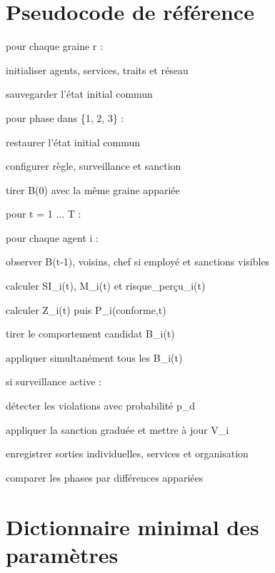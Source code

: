 \documentclass[11pt,a4paper]{article}
\begin{document}
\clearpage
\appendix
\section{Pseudocode de référence}

\begin{tcolorbox}[
  enhanced,breakable,
  colback=Ink,colframe=Ink,
  coltext=white,
  fontupper=\ttfamily\small,
  arc=1mm,left=4mm,right=4mm,top=3mm,bottom=3mm]
pour chaque graine r :\par
\quad initialiser agents, services, traits et réseau\par
\quad sauvegarder l'état initial commun\par
\quad pour phase dans \{1, 2, 3\} :\par
\qquad restaurer l'état initial commun\par
\qquad configurer règle, surveillance et sanction\par
\qquad tirer B(0) avec la même graine appariée\par
\qquad pour t = 1 ... T :\par
\qquad\quad pour chaque agent i :\par
\qquad\qquad observer B(t-1), voisins, chef si employé et sanctions visibles\par
\qquad\qquad calculer SI\_i(t), M\_i(t) et risque\_perçu\_i(t)\par
\qquad\qquad calculer Z\_i(t) puis P\_i(conforme,t)\par
\qquad\qquad tirer le comportement candidat B\_i(t)\par
\qquad\quad appliquer simultanément tous les B\_i(t)\par
\qquad\quad si surveillance active :\par
\qquad\qquad détecter les violations avec probabilité p\_d\par
\qquad\qquad appliquer la sanction graduée et mettre à jour V\_i\par
\qquad\quad enregistrer sorties individuelles, services et organisation\par
\quad comparer les phases par différences appariées\par
\end{tcolorbox}

\section{Dictionnaire minimal des paramètres}
\end{document}
